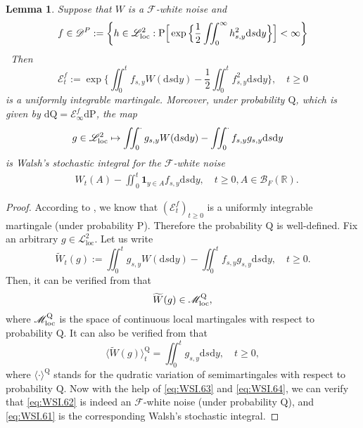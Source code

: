 \documentclass[12pt,a4paper]{amsart}
\numberwithin{equation}{section}
\theoremstyle{plain}
\newtheorem{lemma}[theorem]{Lemma}
\theoremstyle{remark}
\begin{document}
\begin{lemma} \label{thm:WSI.1}
	Suppose that $W$ is a $\mathcal F$-white noise and
\[ f\in \mathscr D^P:= \bigg\{h\in \mathscr L_{\rm loc}^2: \mathrm P\Big[\exp\Big\{\frac{1}{2} \iint_0^\infty h_{s,y}^2\mathrm ds\mathrm dy\Big\}\Big]< \infty\bigg\}
\]\
	Then 
\[
	\mathcal E_t^f
	:= \exp\Big\{\iint_0^t f_{s,y}W(\mathrm ds\mathrm dy) - \frac{1}{2} \iint_0^t f_{s,y}^2 \mathrm ds\mathrm dy\Big\}, 
	\quad t\geq 0
\]
	is a uniformly integrable martingale. 
	Moreover, under probability $\mathrm Q$, which is given by $\mathrm d\mathrm Q =  \mathcal E_\infty^f \mathrm d \mathrm P$, the map 
\begin{align} \label{eq:WSI.61}
& g\in \mathscr L_{\rm loc}^2 \mapsto \iint_0^\cdot g_{s,y}W(\mathrm ds\mathrm dy)  - \iint_0^\cdot f_{s,y} g_{s,y} \mathrm ds\mathrm dy
\end{align}
	is Walsh's stochastic integral for the $\mathcal F$-white noise 
\begin{align} \label{eq:WSI.62}
& W_t(A) - \iint_0^t \mathbf 1_{y\in A}f_{s,y}\mathrm ds\mathrm dy, \quad t\geq 0, A \in \mathcal B_F(\mathbb R).  
\end{align} 
\end{lemma}
\begin{proof}
	According to \cite[Theorem 18.23]{Kallenberg2002Foundations}, we know that $(\mathcal E^f_t)_{t\geq 0}$ is a uniformly integrable martingale (under probability $\mathrm P$).
	Therefore the probability $\mathrm Q$ is well-defined.
	Fix an arbitrary $g\in \mathscr L_{\text{loc}}^2$. 
	Let us write
	\begin{equation} 
	 \widetilde W_t(g):= \iint_0^t g_{s,y} W(\mathrm ds\mathrm dy) - \iint_0^t f_{s,y}g_{s,y} \mathrm ds\mathrm dy, \quad t\geq 0.
	\end{equation} 
	Then, it can be verified from \cite[Theorem 18.19~\& Lemma 18.21]{Kallenberg2002Foundations} that 
\begin{equation} \label{eq:WSI.63}
	\widetilde W(g) \in \mathscr M^\mathrm Q_{\rm loc},
\end{equation} 
	where $\mathscr M_{\rm loc}^\mathrm Q$ is the space of continuous local martingales with respect to probability $\mathrm Q$. 
	It can also be verified from \cite[Theorem 18.20]{Kallenberg2002Foundations} that 
\begin{equation}\label{eq:WSI.64}
	\langle \widetilde W(g) \rangle_t^\mathrm Q = \iint_0^t  g_{s,y}\mathrm ds\mathrm dy, \quad t\geq 0,
\end{equation}
	where $\langle \cdot \rangle^\mathrm Q$ stands for the qudratic variation of semimartingales with respect to probability $\mathrm Q$.
	Now with the help of \eqref{eq:WSI.63} and \eqref{eq:WSI.64}, we can verify that \eqref{eq:WSI.62} is indeed an $\mathcal F$-white noise (under probability $\mathrm Q$), and \eqref{eq:WSI.61} is the corresponding Walsh's stochastic integral.
\end{proof}
\end{document}
